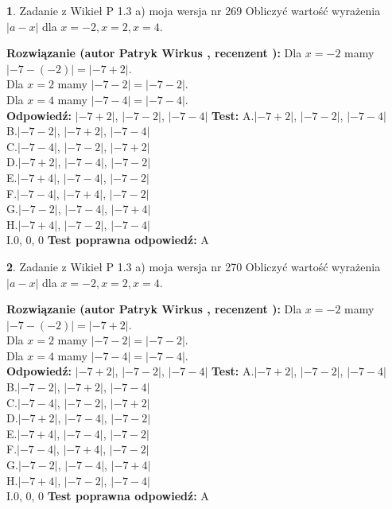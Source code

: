 \documentclass[12pt, a4paper]{article}
\theoremstyle{definition} %
\newtheorem{zad}{}
\newcommand{\zadStart}[1]{\begin{zad}#1\newline}
\newcommand{\zadStop}{\end{zad}}
\newcommand{\rozwStart}[2]{\noindent \textbf{Rozwiązanie (autor #1 , recenzent #2): }\newline}
\newcommand{\rozwStop}{\newline}
\newcommand{\odpStart}{\noindent \textbf{Odpowiedź:}\newline}
\newcommand{\odpStop}{\newline}
\newcommand{\testStart}{\noindent \textbf{Test:}\newline}
\newcommand{\testStop}{\newline}
\newcommand{\kluczStart}{\noindent \textbf{Test poprawna odpowiedź:}\newline}
\newcommand{\kluczStop}{\newline}
\begin{document}
\zadStart{Zadanie z Wikieł P 1.3 a) moja wersja nr 269}
Obliczyć wartość wyrażenia $|a - x|$ dla $x=-2,x=2,x=4$.
\zadStop
\rozwStart{Patryk Wirkus}{}
Dla $x = -2$ mamy $|-7 - (-2)| = |-7 + 2|$.\\
Dla $x = 2$ mamy $|-7 - 2| = |-7 - 2|$.\\
Dla $x = 4$ mamy $|-7 - 4| = |-7 - 4|$.\\
\rozwStop
\odpStart
$|-7 + 2|$, $|-7 - 2|$, $|-7 - 4|$
\odpStop
\testStart
A.$|-7 + 2|$, $|-7 - 2|$, $|-7 - 4|$\\
B.$|-7 - 2|$, $|-7 + 2|$, $|-7 - 4|$\\
C.$|-7 - 4|$, $|-7 - 2|$, $|-7 + 2|$\\
D.$|-7 + 2|$, $|-7 - 4|$, $|-7 - 2|$\\
E.$|-7 + 4|$, $|-7 - 4|$, $|-7 - 2|$\\
F.$|-7 - 4|$, $|-7 + 4|$, $|-7 - 2|$\\
G.$|-7 - 2|$, $|-7 - 4|$, $|-7 + 4|$\\
H.$|-7 + 4|$, $|-7 - 2|$, $|-7 - 4|$\\
I.$0$, $0$, $0$
\testStop
\kluczStart
A
\kluczStop



\zadStart{Zadanie z Wikieł P 1.3 a) moja wersja nr 270}
Obliczyć wartość wyrażenia $|a - x|$ dla $x=-2,x=2,x=4$.
\zadStop
\rozwStart{Patryk Wirkus}{}
Dla $x = -2$ mamy $|-7 - (-2)| = |-7 + 2|$.\\
Dla $x = 2$ mamy $|-7 - 2| = |-7 - 2|$.\\
Dla $x = 4$ mamy $|-7 - 4| = |-7 - 4|$.\\
\rozwStop
\odpStart
$|-7 + 2|$, $|-7 - 2|$, $|-7 - 4|$
\odpStop
\testStart
A.$|-7 + 2|$, $|-7 - 2|$, $|-7 - 4|$\\
B.$|-7 - 2|$, $|-7 + 2|$, $|-7 - 4|$\\
C.$|-7 - 4|$, $|-7 - 2|$, $|-7 + 2|$\\
D.$|-7 + 2|$, $|-7 - 4|$, $|-7 - 2|$\\
E.$|-7 + 4|$, $|-7 - 4|$, $|-7 - 2|$\\
F.$|-7 - 4|$, $|-7 + 4|$, $|-7 - 2|$\\
G.$|-7 - 2|$, $|-7 - 4|$, $|-7 + 4|$\\
H.$|-7 + 4|$, $|-7 - 2|$, $|-7 - 4|$\\
I.$0$, $0$, $0$
\testStop
\kluczStart
A
\kluczStop
\end{document}
